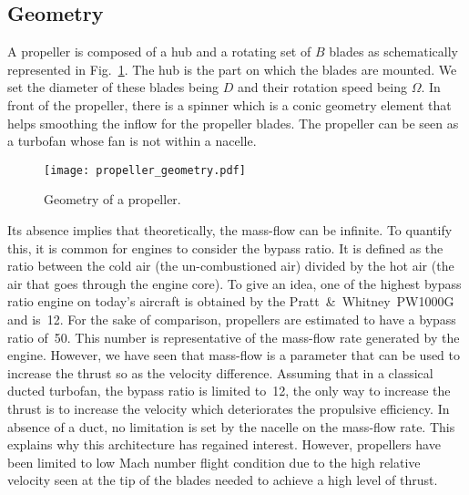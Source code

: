 
\subsection{Geometry}
\label{sub:cror_propeller_geometry}

A propeller is composed of a hub and a rotating set of 
$B$ blades as schematically represented in
Fig.~\ref{fig:cror_propeller_geometry}. The hub
is the part on which the blades are mounted.
We set the diameter of these blades being $D$
and their rotation speed being $\Omega$. 
In front of the propeller, there is a spinner which is
a conic geometry element that helps
smoothing the inflow for the propeller blades.
The propeller can be seen as
a turbofan whose fan is not within a nacelle.
\begin{figure}[htp]
  \centering
  \texttt{[image: propeller\_geometry.pdf]}
  \caption{Geometry of a propeller.}
  \label{fig:cror_propeller_geometry}
\end{figure}
Its absence implies that theoretically, the mass-flow can be
infinite. To quantify this, it is common for engines to
consider the bypass ratio. It is defined as the ratio between the
cold air (the un-combustioned air)
divided by the hot air (the air that goes through the engine core).
To give an idea, one of the highest bypass ratio engine on today's aircraft is obtained
by the Pratt~\&~Whitney~PW1000G and is~12. For the sake of comparison, 
propellers are estimated to have a bypass ratio of~50. 
This number is representative of the mass-flow rate generated by the engine.
However, we have seen that mass-flow is a parameter that can be used to increase
the thrust so as the velocity difference. Assuming that in a classical ducted turbofan, 
the bypass ratio is limited to~12, the only
way to increase the thrust is to increase the 
velocity which deteriorates the propulsive efficiency. In absence of a duct,
no limitation is set by the nacelle on the mass-flow rate.
This explains why this architecture has
regained interest. However, propellers
have been limited to low Mach number flight condition
due to the high relative velocity seen at the tip of the blades
needed to achieve a high level of thrust.

